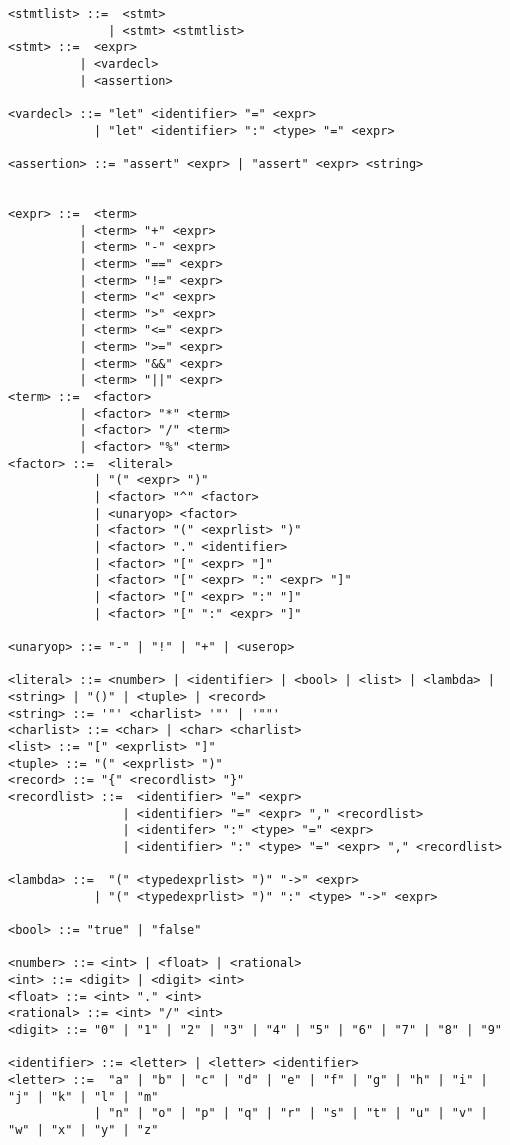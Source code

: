 \begin{verbatim}
<stmtlist> ::=  <stmt> 
              | <stmt> <stmtlist>
<stmt> ::=  <expr> 
          | <vardecl>
          | <assertion>
          
<vardecl> ::= "let" <identifier> "=" <expr>
            | "let" <identifier> ":" <type> "=" <expr>
            
<assertion> ::= "assert" <expr> | "assert" <expr> <string>
                

<expr> ::=  <term> 
          | <term> "+" <expr> 
          | <term> "-" <expr>
          | <term> "==" <expr>
          | <term> "!=" <expr>
          | <term> "<" <expr>
          | <term> ">" <expr>
          | <term> "<=" <expr>
          | <term> ">=" <expr>
          | <term> "&&" <expr>
          | <term> "||" <expr>
<term> ::=  <factor> 
          | <factor> "*" <term> 
          | <factor> "/" <term> 
          | <factor> "%" <term> 
<factor> ::=  <literal> 
            | "(" <expr> ")" 
            | <factor> "^" <factor>
            | <unaryop> <factor>
            | <factor> "(" <exprlist> ")"
            | <factor> "." <identifier>
            | <factor> "[" <expr> "]"
            | <factor> "[" <expr> ":" <expr> "]"
            | <factor> "[" <expr> ":" "]"
            | <factor> "[" ":" <expr> "]"

<unaryop> ::= "-" | "!" | "+" | <userop>

<literal> ::= <number> | <identifier> | <bool> | <list> | <lambda> | <string> | "()" | <tuple> | <record>
<string> ::= '"' <charlist> '"' | '""'
<charlist> ::= <char> | <char> <charlist>
<list> ::= "[" <exprlist> "]"
<tuple> ::= "(" <exprlist> ")"
<record> ::= "{" <recordlist> "}"
<recordlist> ::=  <identifier> "=" <expr> 
                | <identifier> "=" <expr> "," <recordlist>
                | <identifer> ":" <type> "=" <expr> 
                | <identifier> ":" <type> "=" <expr> "," <recordlist>
            
<lambda> ::=  "(" <typedexprlist> ")" "->" <expr>
            | "(" <typedexprlist> ")" ":" <type> "->" <expr>

<bool> ::= "true" | "false"
            
<number> ::= <int> | <float> | <rational>
<int> ::= <digit> | <digit> <int>
<float> ::= <int> "." <int>
<rational> ::= <int> "/" <int>
<digit> ::= "0" | "1" | "2" | "3" | "4" | "5" | "6" | "7" | "8" | "9"

<identifier> ::= <letter> | <letter> <identifier>
<letter> ::=  "a" | "b" | "c" | "d" | "e" | "f" | "g" | "h" | "i" | "j" | "k" | "l" | "m" 
            | "n" | "o" | "p" | "q" | "r" | "s" | "t" | "u" | "v" | "w" | "x" | "y" | "z"


\end{verbatim}
